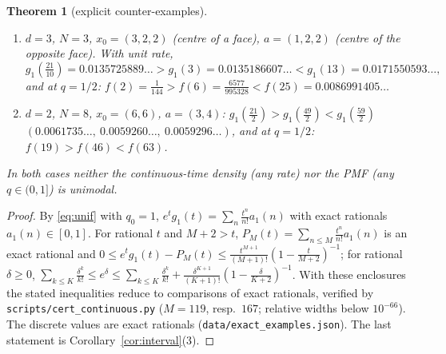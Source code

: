 \documentclass[11pt,a4paper]{article}
\newtheorem{theorem}{Theorem}[section]
\theoremstyle{definition}
\begin{document}
\begin{theorem}[explicit counter-examples]\label{thm:counter}
\begin{enumerate}
\item[(a)] $d=3$, $N=3$, $x_0=(3,2,2)$ (centre of a face), $a=(1,2,2)$ (centre of the opposite face). With unit rate,
\[
g_1(\tfrac{21}{10})=0.0135725889\ldots>g_1(3)=0.0135186607\ldots<g_1(13)=0.0171550593\ldots,
\]
and at $q=1/2$: $f(2)=\frac1{144}>f(6)=\frac{6577}{995328}<f(25)=0.0086991405\ldots$
\item[(b)] $d=2$, $N=8$, $x_0=(6,6)$, $a=(3,4)$: $g_1(\frac{21}2)>g_1(\frac{49}2)<g_1(\frac{59}2)$ $(0.0061735\ldots,\ 0.0059260\ldots,\ 0.0059296\ldots)$, and at $q=1/2$: $f(19)>f(46)<f(63)$.
\end{enumerate}
In both cases neither the continuous-time density (any rate) nor the PMF (any $q\in(0,1]$) is unimodal.
\end{theorem}
\begin{proof}
By \eqref{eq:unif} with $q_0=1$, $e^tg_1(t)=\sum_n\frac{t^n}{n!}a_1(n)$ with exact rationals $a_1(n)\in[0,1]$. For rational $t$ and $M+2>t$, $P_M(t)=\sum_{n\le M}\frac{t^n}{n!}a_1(n)$ is an exact rational and $0\le e^tg_1(t)-P_M(t)\le\frac{t^{M+1}}{(M+1)!}(1-\frac t{M+2})^{-1}$; for rational $\delta\ge0$, $\sum_{k\le K}\frac{\delta^k}{k!}\le e^\delta\le\sum_{k\le K}\frac{\delta^k}{k!}+\frac{\delta^{K+1}}{(K+1)!}(1-\frac\delta{K+2})^{-1}$. With these enclosures the stated inequalities reduce to comparisons of exact rationals, verified by \texttt{scripts/cert\_continuous.py} ($M=119$, resp.\ $167$; relative widths below $10^{-66}$). The discrete values are exact rationals (\texttt{data/exact\_examples.json}). The last statement is Corollary~\ref{cor:interval}(3).
\end{proof}
\end{document}

